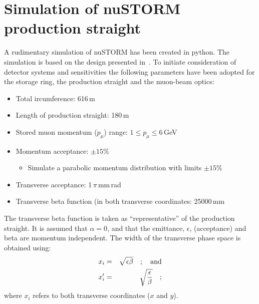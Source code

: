 \newcommand{\dataFormat}{ \noindent \begin{tabular}{|  l | r | c | p{10.0cm} | } \hline Branch: sub-branch & Variable   &  Type  &   Description\\  \hline }
\newcommand{\info}[4]{ {#1}  & {#2}  & {#3} & {#4} \\}
\newcommand{\dataFormatEnd} { \hline \end{tabular}  \nl}
\newcommand{\nl}{\hfill\newline}

\section{Simulation of nuSTORM production straight}
A rudimentary simulation of nuSTORM has been created in python.
The simulation is based on the design presented in~\cite{Ahdida:2654649}.
To initiate consideration of detector systems and sensitivities the
following parameters have been adopted for the storage ring, the
production straight and the muon-beam optics:
\begin{itemize}
  \item Total ircumference: 616\,m
  \item Length of production straight: 180\,m
  \item Stored muon momentum ($p_\mu$) range: $1 \le p_\mu \le 6$\,GeV
  \item Momentum acceptance: $\pm 15$\%
    \begin{itemize}
      \item Simulate a parabolic momentum distribution with limits
        $\pm 15$\%
    \end{itemize}
  \item Transverse acceptance: 1\,$\pi$\,mm\,rad
  \item Transverse beta function (in both transverse coordinates: 25000\,mm
\end{itemize}
The transverse beta function is taken as “representative” of the
production straight.
It is assumed that $\alpha=0$, and that the emittance, $\epsilon$,
(acceptance) and beta are momentum independent. 
The width of the transverse phase space is obtained using:
\begin{eqnarray}
  x_i        & = & \sqrt{\epsilon \beta} \quad {\rm ; \quad and} \nonumber \\
  x_i^\prime  & = & \sqrt{\frac{\epsilon}{\beta}} \quad ;  \nonumber
\end{eqnarray}
where $x_i$ refers to both transverse coordinates ($x$ and $y$).

